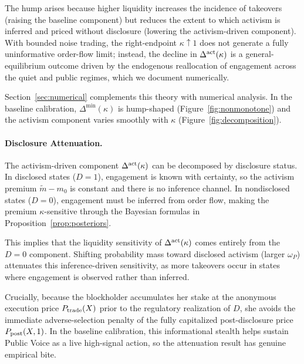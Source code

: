 \documentclass[11pt]{article}
\newcommand{\1}{\mathbf{1}}
\begin{document}
The hump arises because higher liquidity increases the incidence of takeovers (raising the baseline component) but reduces the extent to which activism is inferred and priced without disclosure (lowering the activism-driven component). With bounded noise trading, the right-endpoint $\kappa\uparrow 1$ does not generate a fully uninformative order-flow limit; instead, the decline in $\Delta^{\textup{act}}(\kappa)$ is a general-equilibrium outcome driven by the endogenous reallocation of engagement across the quiet and public regimes, which we document numerically.

Section~\ref{sec:numerical} complements this theory with numerical analysis. In the baseline calibration, $\Delta^{\min}(\kappa)$ is hump-shaped (Figure~\ref{fig:nonmonotone}) and the activism component varies smoothly with $\kappa$ (Figure~\ref{fig:decomposition}).

%
\paragraph{Disclosure Attenuation.}
%

The activism-driven component $\Delta^{\textup{act}}(\kappa)$ can be decomposed by disclosure status. In disclosed states ($D=1$), engagement is known with certainty, so the activism premium $\tilde{m}-m_0$ is constant and there is no inference channel. In nondisclosed states ($D=0$), engagement must be inferred from order flow, making the premium $\kappa$-sensitive through the Bayesian formulas in Proposition~\ref{prop:posteriors}.

This implies that the liquidity sensitivity of $\Delta^{\textup{act}}(\kappa)$ comes entirely from the $D=0$ component. Shifting probability mass toward disclosed activism (larger $\omega_P$) attenuates this inference-driven sensitivity, as more takeovers occur in states where engagement is observed rather than inferred.

Crucially, because the blockholder accumulates her stake at the anonymous execution price $P_{\textup{trade}}(X)$ prior to the regulatory realization of $D$, she avoids the immediate adverse-selection penalty of the fully capitalized post-disclosure price $P_{\textup{post}}(X,1)$. In the baseline calibration, this informational stealth helps sustain Public Voice as a live high-signal action, so the attenuation result has genuine empirical bite.
\end{document}
